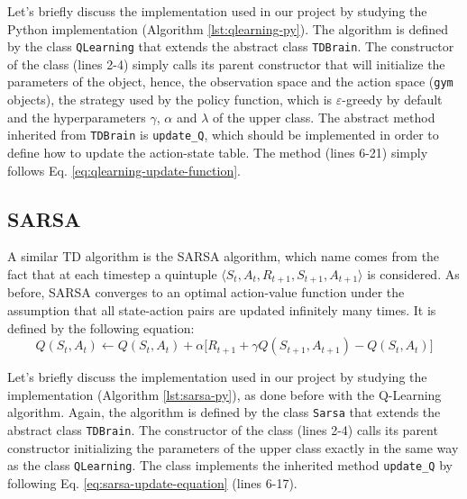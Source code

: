 Let's briefly discuss the implementation used in our project by studying
the Python implementation (Algorithm \ref{lst:qlearning-py}). The algorithm
is defined by the class \texttt{QLearning} that extends the abstract class
\texttt{TDBrain}. The constructor of the class (lines 2-4) simply calls its
parent constructor that will initialize the parameters of the object, hence,
the observation space and the action space (\texttt{gym} objects), the strategy
used by the policy function, which is $\varepsilon$-greedy by default and the
hyperparameters $\gamma$, $\alpha$ and $\lambda$ of the upper class.
The abstract method inherited from \texttt{TDBrain} is \texttt{update\_Q},
which should be implemented in order to define how to update the action-state
table. The method (lines 6-21) simply follows Eq.
\ref{eq:qlearning-update-function}.


\subsection{SARSA}
A similar TD algorithm is the SARSA algorithm, which name
comes from the fact that at each timestep a quintuple $\langle S_t, A_t,
R_{t+1}, S_{t+1}, A_{t+1} \rangle$ is considered. As before, SARSA converges
to an optimal action-value function under the assumption that all state-action
pairs are updated infinitely many times. It is defined
\cite{Suttonrl18} by the following equation:
\begin{equation}
    \label{eq:sarsa-update-equation}
    Q(S_t, A_t) \leftarrow Q(S_t, A_t) + \alpha \Big[ R_{t+1} +
        \gamma Q(S_{t+1}, A_{t+1}) - Q(S_t, A_t) \Big]
\end{equation}

Let's briefly discuss the implementation used in our project by studying the
implementation (Algorithm \ref{lst:sarsa-py}), as done before with the
Q-Learning algorithm. Again, the algorithm is defined by the class
\texttt{Sarsa} that extends the abstract class \texttt{TDBrain}. The constructor
of the class (lines 2-4) calls its parent constructor initializing the
parameters of the upper class exactly in the same way as the class
\texttt{QLearning}. The class implements the inherited method
\texttt{update\_Q} by following Eq. \ref{eq:sarsa-update-equation} (lines
6-17).

